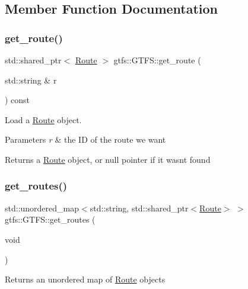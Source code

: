 \subsection{Member Function Documentation}
\mbox{\label{classgtfs_1_1GTFS_a47cfbb8ca6cb8986e95f1038dcc7c04b}} 
\subsubsection{\texorpdfstring{get\+\_\+route()}{get\_route()}}
{\footnotesize\ttfamily std\+::shared\+\_\+ptr$<$ \hyperlink{classgtfs_1_1Route}{Route} $>$ gtfs\+::\+G\+T\+F\+S\+::get\+\_\+route (\begin{DoxyParamCaption}\item[{std\+::string \&}]{r }\end{DoxyParamCaption}) const}

Load a \hyperlink{classgtfs_1_1Route}{Route} object. 
\begin{DoxyParams}{Parameters}
{\em r} & the ID of the route we want \\
\hline
\end{DoxyParams}
\begin{DoxyReturn}{Returns}
a \hyperlink{classgtfs_1_1Route}{Route} object, or null pointer if it wasn\textquotesingle{}t found 
\end{DoxyReturn}
\mbox{\label{classgtfs_1_1GTFS_aef6a88c15cdf8bf788e41c81a14ecc76}} 
\subsubsection{\texorpdfstring{get\+\_\+routes()}{get\_routes()}}
{\footnotesize\ttfamily std\+::unordered\+\_\+map$<$std\+::string, std\+::shared\+\_\+ptr$<$\hyperlink{classgtfs_1_1Route}{Route}$>$ $>$ gtfs\+::\+G\+T\+F\+S\+::get\+\_\+routes (\begin{DoxyParamCaption}\item[{void}]{ }\end{DoxyParamCaption})\hspace{0.3cm}{\ttfamily [inline]}}

\begin{DoxyReturn}{Returns}
an unordered map of \hyperlink{classgtfs_1_1Route}{Route} objects 
\end{DoxyReturn}
\mbox{\label{classgtfs_1_1GTFS_afb9b3152a524f393c4414611dbeeba48}} 
